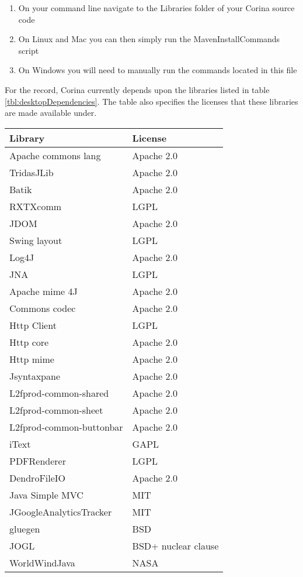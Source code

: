 \begin{enumerate}
 \item On your command line navigate to the Libraries folder of your Corina source code
 \item On Linux and Mac you can then simply run the MavenInstallCommands script
 \item On Windows you will need to manually run the commands located in this file
\end{enumerate}

For the record, Corina currently depends upon the libraries listed in table \ref{tbl:desktopDependencies}.  The table also specifies the licenses that these libraries are made available under.


\begin{table*}[htbp]
\centering
{}
\begin{tabular*}{0.6\textwidth}{ll}
\toprule
Library & License \\
\midrule
Apache commons lang & Apache 2.0 \\
TridasJLib & Apache 2.0 \\
Batik & Apache 2.0 \\ 
RXTXcomm & LGPL\\
JDOM & Apache 2.0\\
Swing layout & LGPL\\
Log4J & Apache 2.0\\
JNA & LGPL\\
Apache mime 4J & Apache 2.0\\
Commons codec & Apache 2.0\\
Http Client &LGPL\\
Http core & Apache 2.0\\
Http mime &Apache 2.0\\
Jsyntaxpane & Apache 2.0\\
L2fprod-common-shared &Apache 2.0\\
L2fprod-common-sheet &Apache 2.0\\
L2fprod-common-buttonbar &Apache 2.0\\
iText &GAPL\\
PDFRenderer & LGPL\\
DendroFileIO & Apache 2.0\\
Java Simple MVC & MIT\\
JGoogleAnalyticsTracker & MIT\\
gluegen & BSD\\
JOGL & BSD+ nuclear clause\\
WorldWindJava & NASA \\

\end{tabular*}
\end{table*}
